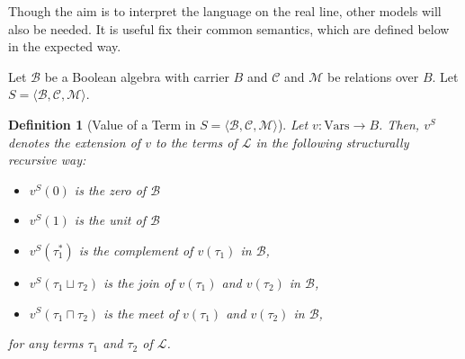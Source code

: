 \documentclass{article}
\newtheorem*{definition}{Definition}
\newcommand{\B}{\mathcal{B}}
\newcommand{\lang}{\mathcal{L}}
\newcommand{\Vars}{\text{Vars}}
\newcommand{\lcup}{\sqcup}
\newcommand{\lcap}{\sqcap}
\newcommand{\lstar}{^*}
\begin{document}
Though the aim is to interpret the language on the real line, other models will also be needed. It is useful fix their common semantics, which are defined below in the expected way.

Let $\B$ be a Boolean algebra with carrier $B$ and $\mathcal{C}$ and $\mathcal{M}$ be relations over $B$. Let $S = \langle \B, \mathcal{C}, \mathcal{M} \rangle$.

\begin{definition}[Value of a Term in $S = \langle \B, \mathcal{C}, \mathcal{M} \rangle$]
  Let $v: \Vars \rightarrow B$. Then,  $v^S$ denotes the extension of $v$ to the terms of $\lang$ in the following structurally recursive way:
  \begin{itemize}
  \item $v^S(0)$ is the zero of $\B$
  \item $v^S(1)$ is the unit of $\B$
  \item $v^S(\tau_1 \lstar)$ is the complement of $v(\tau_1)$ in $\B$,
  \item $v^S(\tau_1 \lcup \tau_2)$ is the join of $v(\tau_1)$ and $v(\tau_2)$ in $\B$,
  \item $v^S(\tau_1 \lcap \tau_2)$ is the meet of $v(\tau_1)$ and $v(\tau_2)$ in $\B$,
  \end{itemize}
for any terms $\tau_1$ and $\tau_2$ of $\lang$.

\end{definition}
\end{document}
